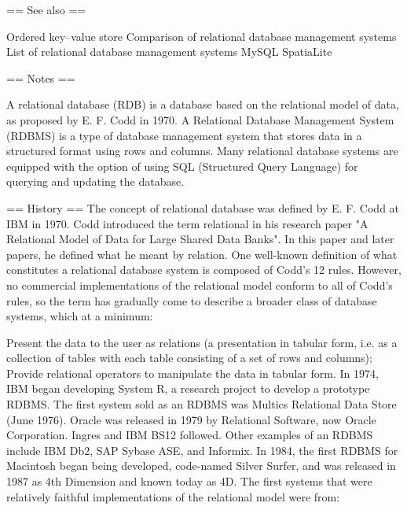== See also ==

Ordered key–value store
Comparison of relational database management systems
List of relational database management systems
MySQL
SpatiaLite


== Notes ==

A relational database (RDB) is a database  based on the relational model of data, as proposed by E. F. Codd in 1970.
A Relational Database Management System (RDBMS) is a type of database management system that stores data in a structured format using rows and columns.
Many relational database systems are equipped with the option of using SQL (Structured Query Language) for querying and updating the database.


== History ==
The concept of relational database was defined by E. F. Codd at IBM in 1970. Codd introduced the term relational in his research paper "A Relational Model of Data for Large Shared Data Banks". In this paper and later papers, he defined what he meant by relation. One well-known definition of what constitutes a relational database system is composed of Codd's 12 rules.
However, no commercial implementations of the relational model conform to all of Codd's rules, so the term has gradually come to describe a broader class of database systems, which at a minimum:

Present the data to the user as relations (a presentation in tabular form, i.e. as a collection of tables with each table consisting of a set of rows and columns);
Provide relational operators to manipulate the data in tabular form.
In 1974, IBM began developing System R, a research project to develop a prototype RDBMS.
The first system sold as an RDBMS was Multics Relational Data Store (June 1976). Oracle was released in 1979 by Relational Software, now Oracle Corporation. Ingres and IBM BS12 followed. Other examples of an RDBMS include IBM Db2, SAP Sybase ASE, and Informix. In 1984, the first RDBMS for Macintosh began being developed, code-named Silver Surfer, and was released in 1987 as 4th Dimension and known today as 4D.
The first systems that were relatively faithful implementations of the relational model were from:

